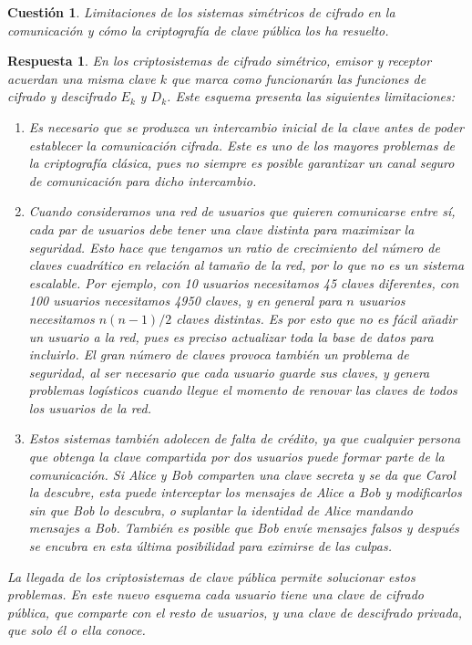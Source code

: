 \documentclass[
  a4paper,
  spanish,
  12pt,
]{scrartcl}
\theoremstyle{ejercicio-style}
\newtheorem{ejer}{Cuestión}
\theoremstyle{remark-style}
\newtheorem*{sol}{Respuesta}
\theoremstyle{teorema-style}
\begin{document}
\begin{ejer}
  Limitaciones de los sistemas simétricos de cifrado en la comunicación y cómo la criptografía de clave pública los ha resuelto.
\end{ejer}

\begin{sol}
  En los criptosistemas de cifrado simétrico, emisor y receptor acuerdan una misma clave $k$ que marca como funcionarán las funciones de cifrado y descifrado $E_k$ y $D_k$. Este esquema presenta las siguientes limitaciones:

\begin{enumerate}
\item Es necesario que se produzca un intercambio inicial de la clave antes de poder establecer la comunicación cifrada. Este es uno de los mayores problemas de la criptografía clásica, pues no siempre es posible garantizar un canal seguro de comunicación para dicho intercambio.

\item Cuando consideramos una red de usuarios que quieren comunicarse entre sí, cada par de usuarios debe tener una clave distinta para maximizar la seguridad. Esto hace que tengamos un ratio de crecimiento del número de claves cuadrático en relación al tamaño de la red, por lo que no es un sistema escalable. Por ejemplo, con 10 usuarios necesitamos 45 claves diferentes, con 100 usuarios necesitamos 4950 claves, y en general para $n$ usuarios necesitamos $n(n-1)/2$ claves distintas.
Es por esto que no es fácil añadir un usuario a la red, pues es preciso actualizar toda la base de datos para incluirlo. El gran número de claves provoca también un problema de seguridad, al ser necesario que cada usuario guarde sus claves, y genera problemas logísticos cuando llegue el momento de renovar las claves de todos los usuarios de la red.

\item Estos sistemas también adolecen de falta de crédito, ya que cualquier persona que obtenga la clave compartida por dos usuarios puede formar parte de la comunicación. Si Alice y Bob comparten una clave secreta y se da que Carol la descubre, esta puede interceptar los mensajes de Alice a Bob y modificarlos sin que Bob lo descubra, o suplantar la identidad de Alice mandando mensajes a Bob. También es posible que Bob envíe mensajes falsos y después se encubra en esta última posibilidad para eximirse de las culpas.
\end{enumerate}

La llegada de los criptosistemas de clave pública permite solucionar estos problemas. En este nuevo esquema cada usuario tiene una clave de cifrado pública, que comparte con el resto de usuarios, y una clave de descifrado privada, que solo él o ella conoce.


\end{sol}
\end{document}
